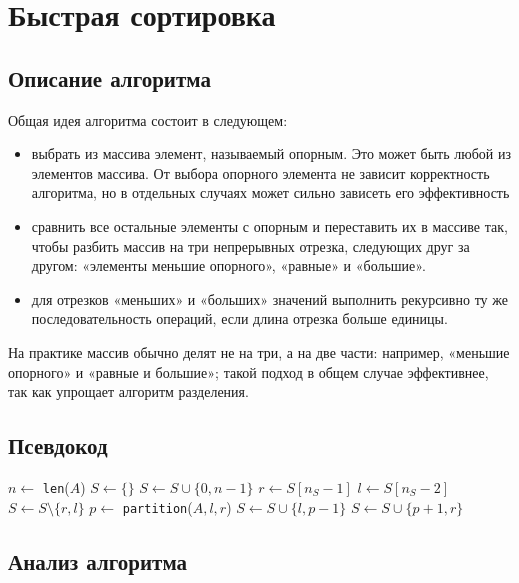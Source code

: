 \section{Быстрая сортировка}

\subsection{Описание алгоритма}

Общая идея алгоритма состоит в следующем:

\begin{itemize}
    \item выбрать из массива элемент, называемый опорным.
    Это может быть любой из элементов массива.
    От выбора опорного элемента не зависит корректность алгоритма, но в отдельных случаях может сильно зависеть его эффективность
    \item сравнить все остальные элементы с опорным и переставить их в массиве так, чтобы разбить массив на три непрерывных отрезка, следующих друг за другом: «элементы меньшие опорного», «равные» и «большие».
    \item для отрезков «меньших» и «больших» значений выполнить рекурсивно ту же последовательность операций, если длина отрезка больше единицы.
\end{itemize}

На практике массив обычно делят не на три, а на две части: например, «меньшие опорного» и «равные и большие»;
такой подход в общем случае эффективнее, так как упрощает алгоритм разделения.\cite{levitin-ref}

\subsection{Псевдокод}

\begin{algorithmic}
\State $n \gets$ \texttt{len}($A$)
\State $S \gets \{\}$ 
\State $S \gets S \cup \{0, n - 1\}$
\State $r \gets S[n_S - 1]$
\State $l \gets S[n_S - 2]$
\State $S \gets S \setminus \{r, l\}$
\State $p \gets$ \texttt{partition}($A, l, r$)
\State $S \gets S \cup \{l, p - 1\}$
\State $S \gets S \cup \{p + 1, r\}$
\EndWhile
\EndProcedure
\end{algorithmic}

\subsection{Анализ алгоритма}

